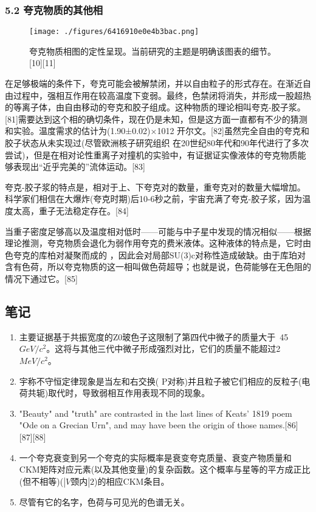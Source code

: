 \subsubsection{5.2 夸克物质的其他相}
\begin{figure}[ht]
\centering
\texttt{[image: ./figures/6416910e0e4b3bac.png]}
\caption{夸克物质相图的定性呈现。当前研究的主题是明确该图表的细节。[10][11]} \label{fig_Quark_12}
\end{figure}
在足够极端的条件下，夸克可能会被解禁闭，并以自由粒子的形式存在。在渐近自由过程中，强相互作用在较高温度下变弱。最终，色禁闭将消失，并形成一股超热的等离子体，由自由移动的夸克和胶子组成。这种物质的理论相叫夸克-胶子浆。[81]需要达到这个相的确切条件，现在仍是未知，但是这方面一直都有不少的猜测和实验。温度需求的估计为(1.90±0.02)×1012 开尔文。[82]虽然完全自由的夸克和胶子状态从未实现过(尽管欧洲核子研究组织 在20世纪80年代和90年代进行了多次尝试)，但是在相对论性重离子对撞机的实验中，有证据证实像液体的夸克物质能够表现出“近乎完美的”流体运动。[83]

夸克-胶子浆的特点是，相对于上、下夸克对的数量，重夸克对的数量大幅增加。科学家们相信在大爆炸(夸克时期)后10-6秒之前，宇宙充满了夸克-胶子浆，因为温度太高，重子无法稳定存在。[84]

当重子密度足够高以及温度相对低时——可能与中子星中发现的情况相似——根据理论推测，夸克物质会退化为弱作用夸克的费米液体。这种液体的特点是，它时由色夸克的库柏对凝聚而成的 ，因此会对局部SU(3)c对称性造成破缺。由于库珀对含有色荷，所以夸克物质的这一相叫做色荷超导；也就是说，色荷能够在无色阻的情况下通过它。[85]

\subsection{笔记}
\begin{enumerate}
\item 主要证据基于共振宽度的Z0玻色子这限制了第四代中微子的质量大于~45 $GeV/c^2$。这将与其他三代中微子形成强烈对比，它们的质量不能超过2 $MeV/c^2$。
\item 宇称不守恒定律现象是当左和右交换( P对称)并且粒子被它们相应的反粒子(电荷共轭)取代时，导致弱相互作用表现不同的现象。
\item "Beauty" and "truth" are contrasted in the last lines of Keats' 1819 poem "Ode on a Grecian Urn", and may have been the origin of those names.[86][87][88]
\item 一个夸克衰变到另一个夸克的实际概率是衰变夸克质量、衰变产物质量和CKM矩阵对应元素(以及其他变量)的复杂函数。这个概率与星等的平方成正比(但不相等)($|V\text{颈内}|2$)的相应CKM条目。
\item 尽管有它的名字，色荷与可见光的色谱无关。
\end{enumerate}

